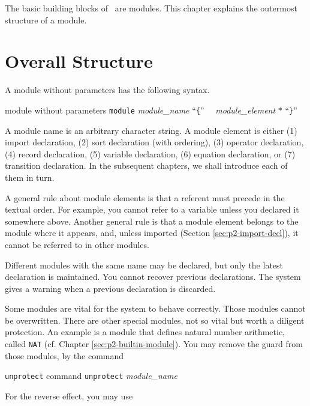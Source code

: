 \documentclass[a4paper]{memoir}
\begin{document}
The basic building blocks of \cafeobj~are modules. This chapter explains
the outermost structure of a module.

\section{Overall Structure}\label{sec:p2-module-decl-syntax}

A module without parameters has the following syntax.

\begin{bsyntax} module without parameters \Hline
\texttt{module} \textit{module\_name} ``\texttt{\{}''
~~\textit{module\_element} $*$
``\texttt{\}}''
\end{bsyntax}

A module name is an arbitrary character string.
A module element is either
(1) import declaration, (2) sort declaration (with ordering),
(3) operator declaration, (4) record declaration,
(5) variable declaration, (6) equation declaration, or
(7) transition declaration.
In the subsequent chapters, we shall introduce each of them in turn.

A general rule about module elements is that a referent must precede
in the textual order. For example, you cannot refer to a variable unless
you declared it somewhere above. Another general rule is that
a module element belongs to the module where it appears, and,
unless imported (Section \ref{sec:p2-import-decl}), it cannot be
referred to in other modules.

Different modules with the same name may be declared, but only the latest
declaration is maintained. You cannot recover previous declarations.
The system gives a warning when a previous declaration is discarded.

Some modules are vital for the system to behave correctly. Those modules
cannot be overwritten. There are other special modules, not so vital but
worth a diligent protection.
An example is a module that defines natural number
arithmetic, called \verb|NAT| (cf. Chapter \ref{sec:p2-builtin-module}).
You may remove the guard from those modules, by the command

\begin{bsyntax} \texttt{unprotect} command  \Hline
\texttt{unprotect} \textit{module\_name}
\end{bsyntax}

For the reverse effect, you may use
\end{document}
